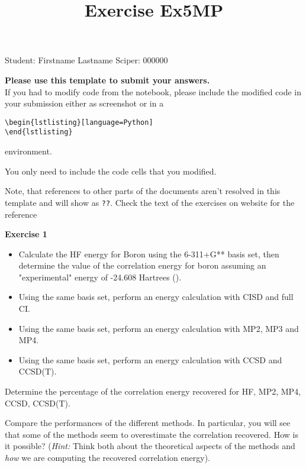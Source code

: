 \documentclass{article}
\title{Exercise Ex5MP}
\begin{document}
\maketitle\maketitle
Student:  Firstname Lastname    Sciper: 000000

\begin{mdframed}
\textbf{Please use this template to submit your answers.}\\
If you had to modify code from the notebook, please include the modified code in your submission either as screenshot or in a

\begin{verbatim}
\begin{lstlisting}[language=Python]
\end{lstlisting}
\end{verbatim}

environment.

You only need to include the code cells that you modified.

Note, that references to other parts of the documents aren't resolved in this template and will show as \texttt{??}. Check the text of the exercises on website for the reference
\end{mdframed}

\begin{mdframed}
\textbf{Exercise 1}\\
\begin{itemize}
\item Calculate the HF energy for Boron using the 6-311+G** basis set, then determine the value of the correlation energy for boron assuming an "experimental" energy of -24.608 Hartrees (\cite{Schaefer_1968}).
\item Using the same basis set, perform an energy calculation with CISD and full CI.
\item Using the same basis set, perform an energy calculation with MP2, MP3 and MP4.
\item Using the same basis set, perform an energy calculation with CCSD and CCSD(T).
\end{itemize}

Determine the percentage of the correlation energy recovered for HF, MP2, MP4, CCSD, CCSD(T).

Compare the performances of the different methods. In particular, you will see that some of the methods seem to overestimate the correlation recovered. How is it possible? (\textit{Hint:} Think both about the theoretical aspects of the methods and \textit{how} we are computing the recovered correlation energy).
\end{mdframed}
\end{document}
